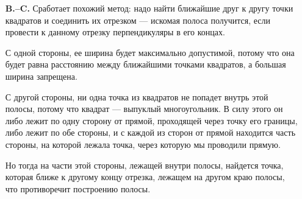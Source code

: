 ﻿
\begin{itemize}

\itA Очевидно, что ширина этой полосы не может быть больше, чем расстояние между самыми близкими друг к другу точками кругов. Сделаем ширину полосы равной этому расстоянию.

Для этого соединим центры кругов отрезком и построим касательные к кругам в точках пересечения отрезка с их границей. Они будут параллельны и образуют полосу максимально допустимой ширины (смотреть рисунок).


\begin{center}  \end{center}

\item[\bfseries B.–C.] Сработает похожий метод: надо найти ближайшие друг к другу точки квадратов и соединить их отрезком — искомая полоса получится, если провести к данному отрезку перпендикуляры в его концах.

С одной стороны, ее ширина будет максимально допустимой, потому что она будет равна расстоянию между ближайшими точками квадратов, а большая ширина запрещена.

С другой стороны, ни одна точка из квадратов не попадет внутрь этой полосы, потому что квадрат — выпуклый многоугольник. В силу этого он либо лежит по одну сторону от прямой, проходящей через точку его границы, либо лежит по обе стороны, и с каждой из сторон от прямой находится часть стороны, на которой лежала точка, через которую мы проводили прямую.

Но тогда на части этой стороны, лежащей внутри полосы, найдется точка, которая ближе к другому концу отрезка, лежащем на другом краю полосы, что противоречит построению полосы.
\end{itemize}